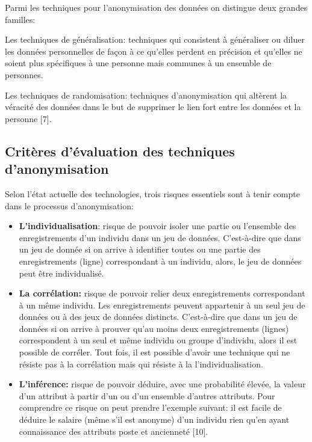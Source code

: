 Parmi les techniques pour l’anonymisation des données on distingue deux grandes familles:  

Les techniques de généralisation: techniques qui consistent à généraliser ou diluer les données personnelles de façon à ce qu’elles perdent en précision et qu’elles ne soient plus spécifiques à une personne mais communes à un ensemble de personnes. 

Les techniques de randomisation:  techniques d’anonymisation qui altèrent la véracité des données dans le but de supprimer le lien fort entre les données et la personne [7]. 

\subsection{Critères d’évaluation des techniques d’anonymisation}

Selon l’état actuelle des technologies, trois risques essentiels sont à tenir compte dans le processus d’anonymisation:  

\begin{itemize}
 
    \item \textbf{L’individualisation}: risque de pouvoir isoler une partie ou l’ensemble des enregistrements d’un individu dans un jeu de données. C’est-à-dire que dans un jeu de donnée si on arrive à identifier toutes ou une partie des enregistrements (ligne) correspondant à un individu, alors, le jeu de données peut être individualisé. 

    \item \textbf{La corrélation:} risque de pouvoir relier deux enregistrements correspondant à un même individu. Les enregistrements peuvent appartenir à un seul jeu de données ou à des jeux de données distincts. C’est-à-dire que dans un jeu de données si on arrive à prouver qu’au moins deux enregistrements (lignes) correspondent à un seul et même individu ou groupe d’individu, alors il est possible de corréler. Tout fois, il est possible d’avoir une technique qui ne résiste pas à la corrélation mais qui résiste à la l’individualisation.  

    \item \textbf{L’inférence:} risque de pouvoir déduire, avec une probabilité élevée, la valeur d’un attribut à partir d’un ou d’un ensemble d’autres attributs. Pour comprendre ce risque on peut prendre l’exemple suivant: il est facile de déduire le salaire (même s’il est anonyme) d’un individu rien qu’en ayant connaissance des attributs poste et ancienneté [10]. 
\end{itemize}